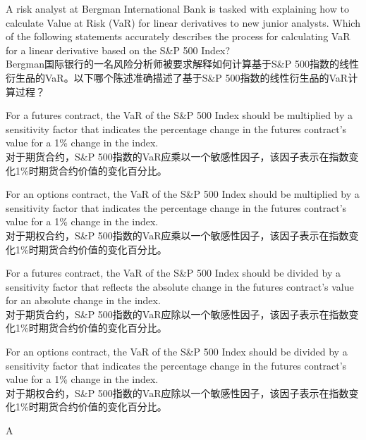 \documentclass{article}
\newcounter{question} %
\begin{document}
\begin{question}
    A risk analyst at Bergman International Bank is tasked with explaining how to calculate Value at Risk (VaR) for linear derivatives to new junior analysts. Which of the following statements accurately describes the process for calculating VaR for a linear derivative based on the S\&P 500 Index?
    \\Bergman国际银行的一名风险分析师被要求解释如何计算基于S\&P 500指数的线性衍生品的VaR。以下哪个陈述准确描述了基于S\&P 500指数的线性衍生品的VaR计算过程？
\end{question}

\begin{choices}
    \item For a futures contract, the VaR of the S\&P 500 Index should be multiplied by a sensitivity factor that indicates the percentage change in the futures contract's value for a 1\% change in the index.\\
    对于期货合约，S\&P 500指数的VaR应乘以一个敏感性因子，该因子表示在指数变化1\%时期货合约价值的变化百分比。
    \item For an options contract, the VaR of the S\&P 500 Index should be multiplied by a sensitivity factor that indicates the percentage change in the futures contract's value for a 1\% change in the index.\\
    对于期权合约，S\&P 500指数的VaR应乘以一个敏感性因子，该因子表示在指数变化1\%时期货合约价值的变化百分比。
    \item For a futures contract, the VaR of the S\&P 500 Index should be divided by a sensitivity factor that reflects the absolute change in the futures contract's value for an absolute change in the index.\\
    对于期货合约，S\&P 500指数的VaR应除以一个敏感性因子，该因子表示在指数变化1\%时期货合约价值的变化百分比。
    \item For an options contract, the VaR of the S\&P 500 Index should be divided by a sensitivity factor that indicates the percentage change in the futures contract's value for a 1\% change in the index.\\
    对于期权合约，S\&P 500指数的VaR应除以一个敏感性因子，该因子表示在指数变化1\%时期货合约价值的变化百分比。
\end{choices}

\begin{correctanswer}
    A
\end{correctanswer}
\end{document}
